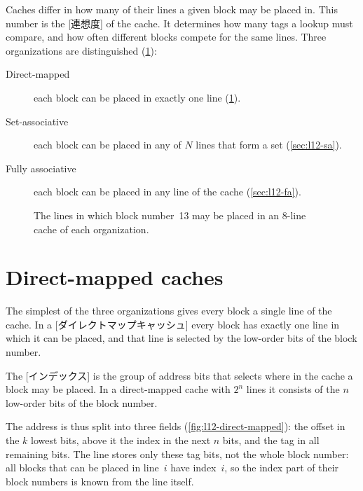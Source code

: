 \documentclass[../main.tex]{subfiles}
\begin{document}
Caches differ in how many of their lines a given block may be placed
in.  This number is the
[連想度] of the cache.  It determines how many tags a
lookup must compare, and how often different blocks compete for the same
lines.  Three organizations are distinguished (\cref{fig:l12-placement}):
\begin{description}
  \item[Direct-mapped] each block can be placed in exactly one line
    (\cref{sec:l12-dm}).
  \item[Set-associative] each block can be placed in any of $N$ lines that
    form a set (\cref{sec:l12-sa}).
  \item[Fully associative] each block can be placed in any line of the
    cache (\cref{sec:l12-fa}).
\end{description}

\begin{figure}[htbp]
  \centering
  
  \caption{The lines in which block number~13 may be placed in an 8-line
    cache of each organization.}
  \label{fig:l12-placement}
\end{figure}

\section{Direct-mapped caches}
\label{sec:l12-dm}

The simplest of the three organizations gives every block a single line of
the cache.  In a
[ダイレクトマップキャッシュ] every block has exactly
one line in which it can be placed, and that line is selected by the
low-order bits of the block number.

\begin{definition}[Index]
  The [インデックス] is the group of address bits that selects
  where in the cache a block may be placed.  In a direct-mapped cache with
  $2^{n}$ lines it consists of the $n$ low-order bits of the block number.
\end{definition}

The address is thus split into three fields (\cref{fig:l12-direct-mapped}):
the offset in the $k$ lowest bits, above it the index in the next $n$ bits,
and the tag in all remaining bits.  The line stores only these tag bits, not
the whole block number: all blocks that can be placed in line~$i$ have
index~$i$, so the index part of their block numbers is known from the line
itself.
\end{document}
